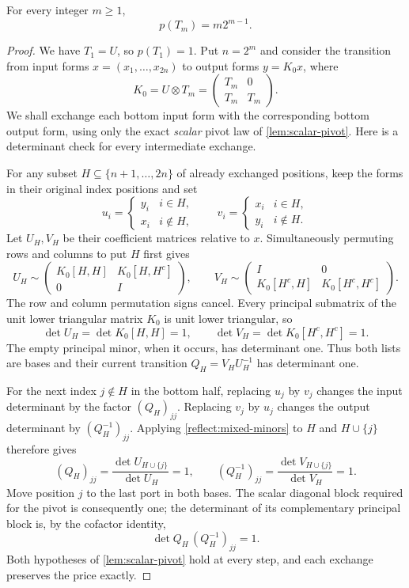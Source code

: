 \begin{lemma}
\label{reflect:triangular-price}
For every integer $m\geq1$,
\[
 p(T_m)=m2^{m-1}.
\]
\end{lemma}

\begin{proof}
We have $T_1=U$, so $p(T_1)=1$.  Put $n=2^m$ and consider the transition
from input forms $x=(x_1,\ldots,x_{2n})$ to output forms $y=K_0x$, where
\[
 K_0=U\otimes T_m
     =\begin{pmatrix}T_m&0\\ T_m&T_m\end{pmatrix}.
\]
We shall exchange each bottom input form with the corresponding bottom
output form, using only the exact \emph{scalar} pivot law of
\cref{lem:scalar-pivot}.  Here is a determinant check for every
intermediate exchange.

For any subset $H\subseteq\{n+1,\ldots,2n\}$ of already exchanged
positions, keep the forms in their original index positions and set
\[
 u_i=\begin{cases}y_i&i\in H,\\x_i&i\notin H,\end{cases}
 \qquad
 v_i=\begin{cases}x_i&i\in H,\\y_i&i\notin H.\end{cases}
\]
Let $U_H,V_H$ be their coefficient matrices relative to $x$.
Simultaneously permuting rows and columns to put $H$ first gives
\[
 U_H\sim
 \begin{pmatrix}K_0[H,H]&K_0[H,H^c]\\0&I\end{pmatrix},\qquad
 V_H\sim
 \begin{pmatrix}I&0\\K_0[H^c,H]&K_0[H^c,H^c]\end{pmatrix}.
\]
The row and column permutation signs cancel.  Every principal submatrix
of the unit lower triangular matrix $K_0$ is unit lower triangular, so
\begin{equation}
 \det U_H=\det K_0[H,H]=1,
 \qquad
 \det V_H=\det K_0[H^c,H^c]=1.
 \label{reflect:mixed-minors}
\end{equation}
The empty principal minor, when it occurs, has determinant one.
Thus both lists are bases and their current transition
$Q_H=V_HU_H^{-1}$ has determinant one.

For the next index $j\notin H$ in the bottom half, replacing $u_j$ by
$v_j$ changes the input determinant by the factor $(Q_H)_{jj}$.
Replacing $v_j$ by $u_j$ changes the output determinant by
$(Q_H^{-1})_{jj}$.  Applying \eqref{reflect:mixed-minors} to $H$ and
$H\cup\{j\}$ therefore gives
\[
 (Q_H)_{jj}=\frac{\det U_{H\cup\{j\}}}{\det U_H}=1,
 \qquad
 (Q_H^{-1})_{jj}=\frac{\det V_{H\cup\{j\}}}{\det V_H}=1.
\]
Move position $j$ to the last port in both bases.  The scalar diagonal
block required for the pivot is consequently one; the determinant of
its complementary principal block is, by the cofactor identity,
\[
 \det Q_H\,(Q_H^{-1})_{jj}=1.
\]
Both hypotheses of \cref{lem:scalar-pivot} hold at every step, and each
exchange preserves the price exactly.


\end{proof}
